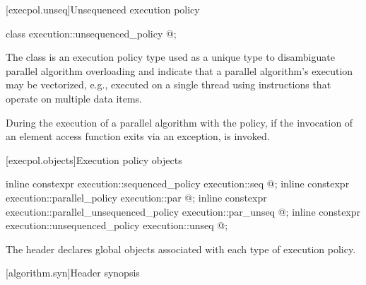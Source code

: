[execpol.unseq]{Unsequenced execution policy}

%
\begin{itemdecl}
class execution::unsequenced_policy { @\unspec@ };
\end{itemdecl}

\begin{itemdescr}
\pnum
The class  is an execution policy type
used as a unique type to disambiguate parallel algorithm overloading and
indicate that a parallel algorithm's execution may be vectorized,
e.g., executed on a single thread using instructions
that operate on multiple data items.

\pnum
During the execution of a parallel algorithm with
the  policy,
if the invocation of an element access function exits via an exception,
 is invoked.
\end{itemdescr}

[execpol.objects]{Execution policy objects}

%
%
%
%
%
%
%
%
\begin{itemdecl}
inline constexpr execution::sequenced_policy            execution::seq{ @\unspec@ };
inline constexpr execution::parallel_policy             execution::par{ @\unspec@ };
inline constexpr execution::parallel_unsequenced_policy execution::par_unseq{ @\unspec@ };
inline constexpr execution::unsequenced_policy          execution::unseq{ @\unspec@ };
\end{itemdecl}

\begin{itemdescr}
\pnum
The header  declares global objects associated with each type of execution policy.
\end{itemdescr}

[algorithm.syn]{Header  synopsis}
%

